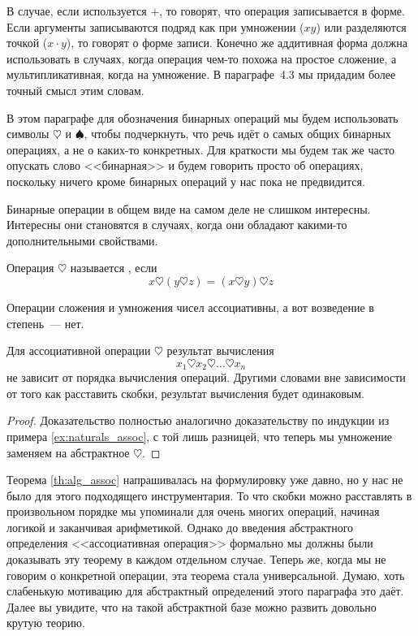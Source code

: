 В случае, если используется $+$, то говорят, что операция записывается в  форме. Если аргументы записываются подряд как при умножении ($xy$) или разделяются точкой ($x\cdot y$), то говорят о  форме записи. Конечно же аддитивная форма должна использовать в случаях, когда операция чем-то похожа на простое сложение, а мультипликативная, когда на умножение. В параграфе~4.3 мы придадим более точный смысл этим словам.

В этом параграфе для обозначения бинарных операций мы будем использовать символы $\heartsuit$ и $\spadesuit$, чтобы подчеркнуть, что речь идёт о самых общих бинарных операциях, а не о каких-то конкретных. Для краткости мы будем так же часто опускать слово <<бинарная>> и будем говорить просто об операциях, поскольку ничего кроме бинарных операций у нас пока не предвидится.

Бинарные операции в общем виде на самом деле не слишком интересны. Интересны они становятся в случаях, когда они обладают какими-то дополнительными свойствами.

\begin{definition}
Операция $\heartsuit$ называется , если
$$x\heartsuit(y\heartsuit z) = (x\heartsuit y)\heartsuit z$$
\end{definition}

\begin{example}
Операции сложения и умножения чисел ассоциативны, а вот возведение в степень~--- нет.
\end{example}

\begin{thm}\label{th:alg_assoc}
Для ассоциативной операции $\heartsuit$ результат вычисления
$$x_1\heartsuit x_2\heartsuit\ldots\heartsuit x_n$$
не зависит от порядка вычисления операций. Другими словами вне зависимости от того как расставить скобки, результат вычисления будет одинаковым.
\end{thm}
\begin{proof}
Доказательство полностью аналогично доказательству по индукции из примера \ref{ex:naturals_assoc}, с той лишь разницей, что теперь мы умножение заменяем на абстрактное $\heartsuit$.
\end{proof}

Теорема \ref{th:alg_assoc} напрашивалась на формулировку уже давно, но у нас не было для этого подходящего инструментария. То что скобки можно расставлять в произвольном порядке мы упоминали для очень многих операций, начиная логикой и заканчивая арифметикой. Однако до введения абстрактного определения <<ассоциативная операция>> формально мы должны были доказывать эту теорему в каждом отдельном случае. Теперь же, когда мы не говорим о конкретной операции, эта теорема стала универсальной. Думаю, хоть слабенькую мотивацию для абстрактный определений этого параграфа это даёт. Далее вы увидите, что на такой абстрактной базе можно развить довольно крутую теорию.

